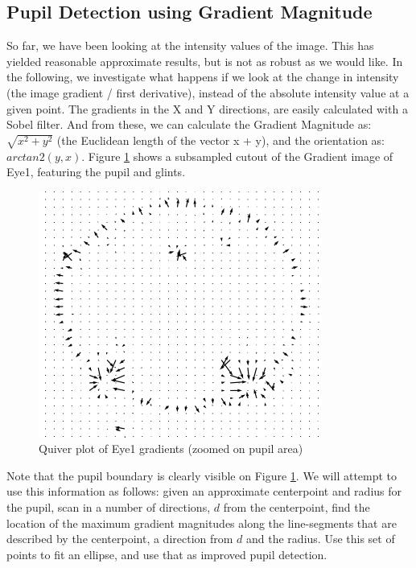 \documentclass[a4paper,11pt]{article}
\begin{document}
\subsection{Pupil Detection using Gradient Magnitude}
So far, we have been looking at the intensity values of the image. This has yielded reasonable approximate results, but is not as robust as we would like. In the following, we investigate what happens if we look at the change in intensity (the image gradient / first derivative), instead of the absolute intensity value at a given point.
The gradients in the X and Y directions, are easily calculated with a Sobel filter. And from these, we can calculate the Gradient Magnitude as: $\sqrt{x^2 + y^2}$ (the Euclidean length of the vector x + y), and the orientation as: $arctan2(y, x)$. Figure \ref{fig:quiver} shows a subsampled cutout of the Gradient image of Eye1, featuring the pupil and glints.

\begin{figure}[H]
  \centering
  \includegraphics[scale=0.5]{quiver_cutout}
  \caption{Quiver plot of Eye1 gradients (zoomed on pupil area)}
  \label{fig:quiver}
\end{figure}

Note that the pupil boundary is clearly visible on Figure \ref{fig:quiver}. We will attempt to use this information as follows: given an approximate centerpoint and radius for the pupil, scan in a number of directions, $d$ from the centerpoint, find the location of the maximum gradient magnitudes along the line-segments that are described by the centerpoint, a direction from $d$ and the radius. Use this set of points to fit an ellipse, and use that as improved pupil detection.
\end{document}

